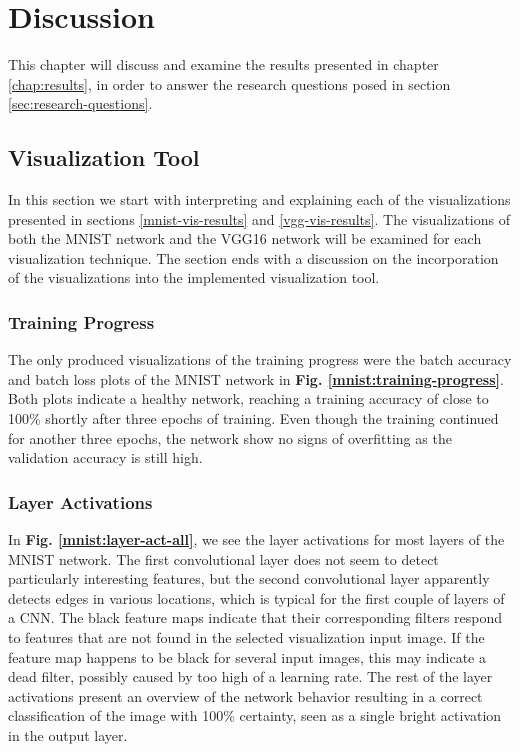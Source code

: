 
\chapter{Discussion} \label{chap:discussion}

This chapter will discuss and examine the results presented in chapter \ref{chap:results}, in order to answer the research questions posed in section \ref{sec:research-questions}.

\section{Visualization Tool}

In this section we start with interpreting and explaining each of the visualizations presented in sections \ref{mnist-vis-results} and \ref{vgg-vis-results}. The visualizations of both the MNIST network and the VGG16 network will be examined for each visualization technique. The section ends with a discussion on the incorporation of the visualizations into the implemented visualization tool.


\subsection{Training Progress}

The only produced visualizations of the training progress were the batch accuracy and batch loss plots of the MNIST network in \textbf{Fig. \ref{mnist:training-progress}}. Both plots indicate a healthy network, reaching a training accuracy of close to 100\% shortly after three epochs of training. Even though the training continued for another three epochs, the network show no signs of overfitting as the validation accuracy is still high.

\subsection{Layer Activations}

In \textbf{Fig. \ref{mnist:layer-act-all}}, we see the layer activations for most layers of the MNIST network. The first convolutional layer does not seem to detect particularly interesting features, but the second convolutional layer apparently detects edges in various locations, which is typical for the first couple of layers of a CNN. The black feature maps indicate that their corresponding filters respond to features that are not found in the selected visualization input image. If the feature map happens to be black for several input images, this may indicate a dead filter, possibly caused by too high of a learning rate. The rest of the layer activations present an overview of the network behavior resulting in a correct classification of the image with 100\% certainty, seen as a single bright activation in the output layer. \\

